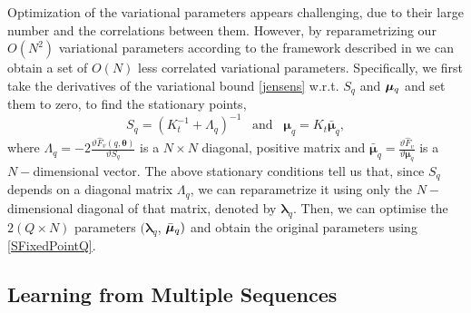 \documentclass{article} %
\begin{document}
Optimization of the variational parameters appears challenging, due to
their large number and the correlations between them. However, by
reparametrizing our $O \left( N^2 \right)$ variational parameters
according to the framework described in
\cite{OpperFixedPointCovariance} we can obtain a set of $O(N)$ less
correlated variational parameters. Specifically, we first take the
derivatives of the variational bound \eqref{jensens} w.r.t. $S_q$ and
$\boldsymbol \mu_q$ and set them to zero, to find the stationary
points,
\begin{equation}
S_q = \left( \mathit{K}_t^{-1} + \Lambda_q \right)^{-1} \;\;\; \text{and}  \;\;\;  \boldsymbol \mu_q = K_t \bar{\boldsymbol \mu}_q, \label{SFixedPointQ}
\end{equation}
where $\Lambda_q = - 2\frac{\vartheta \mathit{\hat{F}_v(q, \boldsymbol
    \theta)}}{\vartheta \mathit{S_q}}$ is a $N \times N$ diagonal,
positive matrix and $\bar{\boldsymbol \mu}_q = \frac{\vartheta
  \hat{F}_v}{\vartheta \boldsymbol \mu_q}$ is a $N-$dimensional
vector.
The above stationary conditions tell us that, since $S_q$ depends on a
diagonal matrix $\Lambda_q$, we can reparametrize it using only the
$N-$dimensional diagonal of that matrix, denoted by $\boldsymbol
\lambda_q$.  Then, we can optimise the $2 (Q \times N)$ parameters $(
\boldsymbol \lambda_q$, $\bar{\boldsymbol \mu}_q)$ and obtain the original
parameters using \eqref{SFixedPointQ}.



\subsection{Learning from Multiple Sequences \label{sequences}}
\end{document}
